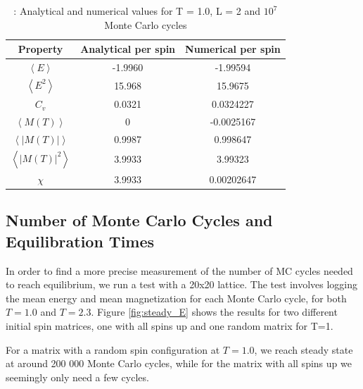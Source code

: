 \documentclass{article}
\begin{document}
	{\renewcommand{\arraystretch}{1.5}
	\begin{table}[h!]
		\caption{: Analytical and numerical values for T = 1.0, L = 2 and $10^7$ Monte Carlo cycles }
			\label{Tab: values}
			\centering
		\begin{tabular}{c c c}
			Property & Analytical per spin & Numerical per spin \\
			\hline
			$\left<E\right>$  & -1.9960 & -1.99594\\
			$\left<E^2\right>$  &15.968  &15.9675 \\
			$C_v$ & 0.0321 & 0.0324227 \\
			$\left<M(T)\right>$ & 0 & -0.0025167\\
			$\left<|M(T)|\right>$ & 0.9987 & 0.998647 \\
			$\left<|M(T)|^2\right>$  & 3.9933 & 3.99323\\
			$\chi$  & 3.9933 & 0.00202647\\
		\end{tabular}
	\end{table}

	\subsection{Number of Monte Carlo Cycles and Equilibration Times}
		In order to find a more precise measurement of the number of MC cycles needed to reach equilibrium, we run a test with a 20x20 lattice. The test involves logging the mean energy and mean magnetization for each Monte Carlo cycle, for both $T=1.0$ and $T=2.3$. Figure \ref{fig:steady_E} shows the results for two different initial spin matrices, one with all spins up and one random matrix for T=1.

		For a matrix with a random spin configuration at $T=1.0$, we reach steady state at around 200 000 Monte Carlo cycles, while for the matrix with all spins up we seemingly only need a few cycles.

}
\end{document}

